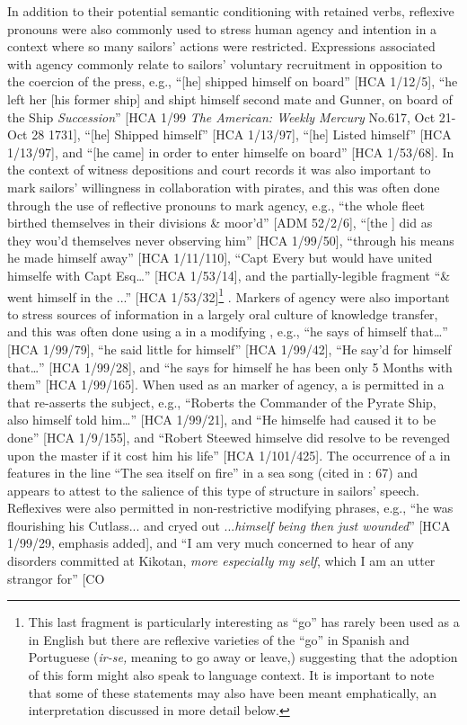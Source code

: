 In addition to their potential semantic conditioning with retained  verbs, reflexive pronouns were also commonly used to stress human agency and intention in a context where so many sailors’ actions were restricted. Expressions associated with  agency commonly relate to sailors’ voluntary recruitment in opposition to the coercion of the press, e.g., “[he] shipped himself on board” [HCA 1/12/5], “he left her [his former ship] and shipt himself second mate and Gunner, on board of the Ship \textit{Succession}” [HCA 1/99 \textit{The American: Weekly Mercury} No.617, Oct 21-Oct 28 1731], “[he] Shipped himself” [HCA 1/13/97], “[he] Listed himself” [HCA 1/13/97], and “[he came] in order to enter himselfe on board” [HCA 1/53/68]. In the context of witness depositions and court records it was also important to mark sailors’ willingness in collaboration with pirates, and this was often done through the use of reflective pronouns to mark agency, e.g., “the whole fleet birthed themselves in their divisions \& moor’d” [ADM 52/2/6], “[the ] did as they wou’d themselves never observing him” [HCA 1/99/50], “through his means he made himself away” [HCA 1/11/110], “Capt Every but would have united himselfe with Capt Esq…” [HCA 1/53/14], and the partially-legible fragment “\& went himself in the ...” [HCA 1/53/32]\footnote{This last fragment is particularly interesting as “go” has rarely been used as a  in English but there are reflexive varieties of the  “go” in Spanish and Portuguese (\textit{ir-se,} meaning to go away or leave,) suggesting that the adoption of this form might also speak to language context. It is important to note that some of these statements may also have been meant emphatically, an interpretation discussed in more detail below.} . Markers of agency were also important to stress sources of information in a largely oral culture of knowledge transfer, and this was often done using a  in a modifying , e.g., “he says of himself that…” [HCA 1/99/79], “he said little for himself” [HCA 1/99/42], “He say’d for himself that…” [HCA 1/99/28], and “he says for himself he has been only 5 Months with them” [HCA 1/99/165]. When used as an  marker of agency, a  is permitted in a  that re-asserts the  subject, e.g., “Roberts the Commander of the Pyrate Ship, also himself told him…” [HCA 1/99/21], and “He himselfe had caused it to be done” [HCA 1/9/155], and “Robert Steewed himselve did resolve to be revenged upon the master if it cost him his life” [HCA 1/101/425]. The occurrence of a  in  features in the line “The sea itself on fire” in a  sea song (cited in \citealt{Palmer1986}: 67) and appears to attest to the salience of this type of structure in sailors’ speech. Reflexives were also permitted in non-restrictive modifying phrases, e.g., “he was flourishing his Cutlass... and cryed out ...\textit{himself being then just wounded}” [HCA 1/99/29, emphasis added], and “I am very much concerned to hear of any disorders committed at Kikotan, \textit{more especially my self}, which I am an utter strangor for” [CO 